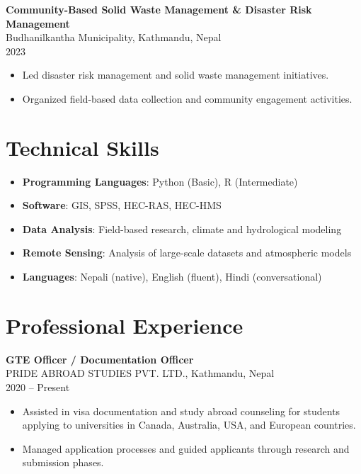 \documentclass[a4paper,10pt]{article}
\begin{document}
\vspace{0.2cm}

\noindent
\textbf{Community-Based Solid Waste Management \& Disaster Risk Management} \\
Budhanilkantha Municipality, Kathmandu, Nepal \\
2023 \\
\begin{itemize}[noitemsep]
    \item Led disaster risk management and solid waste management initiatives.
    \item Organized field-based data collection and community engagement activities.
\end{itemize}

\vspace{0.3cm}

\section*{Technical Skills}
\begin{itemize}[noitemsep]
    \item \textbf{Programming Languages}: Python (Basic), R (Intermediate)
    \item \textbf{Software}: GIS, SPSS, HEC-RAS, HEC-HMS
    \item \textbf{Data Analysis}: Field-based research, climate and hydrological modeling
    \item \textbf{Remote Sensing}: Analysis of large-scale datasets and atmospheric models
    \item \textbf{Languages}: Nepali (native), English (fluent), Hindi (conversational)
\end{itemize}

\vspace{0.3cm}

\section*{Professional Experience}
\noindent
\textbf{GTE Officer / Documentation Officer} \\
PRIDE ABROAD STUDIES PVT. LTD., Kathmandu, Nepal \\
2020 – Present \\
\begin{itemize}[noitemsep]
    \item Assisted in visa documentation and study abroad counseling for students applying to universities in Canada, Australia, USA, and European countries.
    \item Managed application processes and guided applicants through research and submission phases.
\end{itemize}
\end{document}
